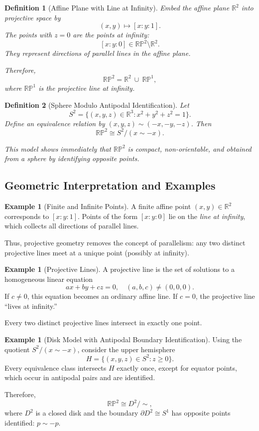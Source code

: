 \documentclass[12pt,a4paper]{article}
\theoremstyle{plain}
\newtheorem{definition}{Definition}
\theoremstyle{definition}      %
\newtheorem{example}[theorem]{Example}
\begin{document}
\begin{definition}[Affine Plane with Line at Infinity]
	Embed the affine plane $\mathbb{R}^2$ into projective space by
	\[
	(x,y) \longmapsto [x : y : 1].
	\]
	The points with $z=0$ are the \emph{points at infinity}:
	\[
	[x : y : 0] \in \mathbb{RP}^2 \setminus \mathbb{R}^2.
	\]
	They represent directions of parallel lines in the affine plane.
	
	Therefore,
	\[
	\mathbb{RP}^2 = \mathbb{R}^2 \ \cup\  \mathbb{RP}^1,
	\]
	where $\mathbb{RP}^1$ is the \emph{projective line at infinity}.
\end{definition}

\begin{definition}[Sphere Modulo Antipodal Identification]
	Let
	\[
	S^2 = \{ (x,y,z)\in\mathbb{R}^3 : x^2 + y^2 + z^2 = 1 \}.
	\]
	Define an equivalence relation by $(x,y,z) \sim (-x,-y,-z)$.
	Then
	\[
	\mathbb{RP}^2 \cong S^2 / (x \sim -x).
	\]
	
	This model shows immediately that $\mathbb{RP}^2$ is compact, non-orientable,
	and obtained from a sphere by identifying opposite points.
\end{definition}

\subsection{Geometric Interpretation and Examples}

\begin{example}[Finite and Infinite Points]
	A finite affine point $(x,y)\in\mathbb{R}^2$ corresponds to $[x:y:1]$.
	Points of the form $[x:y:0]$ lie on the \emph{line at infinity}, which
	collects all directions of parallel lines.
	
	Thus, projective geometry removes the concept of parallelism:
	any two distinct projective lines meet at a unique point (possibly at infinity).
\end{example}

\begin{example}[Projective Lines]
	A projective line is the set of solutions to a homogeneous linear equation
	\[
	ax + by + cz = 0,
	\quad (a,b,c) \neq (0,0,0).
	\]
	If $c \neq 0$, this equation becomes an ordinary affine line.  
	If $c=0$, the projective line ``lives at infinity.''
	
	Every two distinct projective lines intersect in exactly one point.
\end{example}

\begin{example}[Disk Model with Antipodal Boundary Identification]
	Using the quotient $S^2/(x\sim -x)$, consider the upper hemisphere
	\[
	H = \{(x,y,z) \in S^2 : z \ge 0\}.
	\]
	Every equivalence class intersects $H$ exactly once, except for equator points,
	which occur in antipodal pairs and are identified.
	
	Therefore,
	\[
	\mathbb{RP}^2 \cong D^2 /\!\sim , 
	\]
	where $D^2$ is a closed disk and the boundary $\partial D^2 \cong S^1$ has
	opposite points identified: $p \sim -p$.
\end{example}
\end{document}
